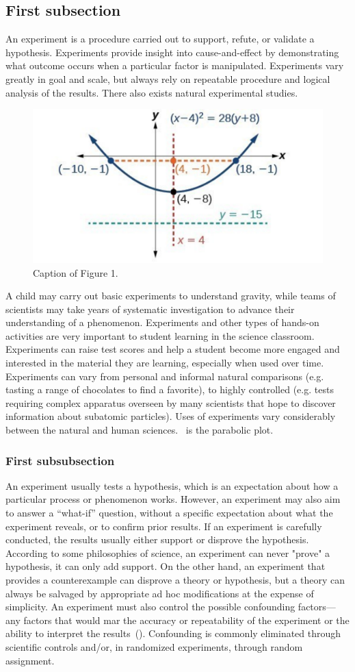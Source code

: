 \documentclass[11pt, a4paper]{article}
\begin{document}
\subsection{First subsection}
An experiment is a procedure carried out to support, refute, or validate a hypothesis. Experiments provide insight into cause-and-effect by demonstrating what outcome occurs when a particular factor is manipulated. Experiments vary greatly in goal and scale, but always rely on repeatable procedure and logical analysis of the results. There also exists natural experimental studies.

\begin{figure}
	\centering
	\includegraphics[width=0.45\linewidth]{parabolic}
	\caption{Caption of Figure 1.}
	\label{fig:parabolic}
\end{figure}

A child may carry out basic experiments to understand gravity, while teams of scientists may take years of systematic investigation to advance their understanding of a phenomenon. Experiments and other types of hands-on activities are very important to student learning in the science classroom. Experiments can raise test scores and help a student become more engaged and interested in the material they are learning, especially when used over time. Experiments can vary from personal and informal natural comparisons (e.g. tasting a range of chocolates to find a favorite), to highly controlled (e.g. tests requiring complex apparatus overseen by many scientists that hope to discover information about subatomic particles). Uses of experiments vary considerably between the natural and human sciences.~ is the parabolic plot.

\subsubsection{First subsubsection}
An experiment usually tests a hypothesis, which is an expectation about how a particular process or phenomenon works. However, an experiment may also aim to answer a ``what-if'' question, without a specific expectation about what the experiment reveals, or to confirm prior results. If an experiment is carefully conducted, the results usually either support or disprove the hypothesis. According to some philosophies of science, an experiment can never "prove" a hypothesis, it can only add support. On the other hand, an experiment that provides a counterexample can disprove a theory or hypothesis, but a theory can always be salvaged by appropriate ad hoc modifications at the expense of simplicity. An experiment must also control the possible confounding factors—any factors that would mar the accuracy or repeatability of the experiment or the ability to interpret the results~(). Confounding is commonly eliminated through scientific controls and/or, in randomized experiments, through random assignment.
\end{document}
